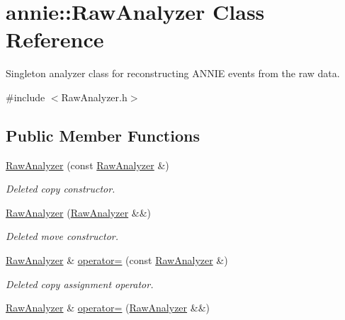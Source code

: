 \hypertarget{classannie_1_1RawAnalyzer}{
\section{annie::RawAnalyzer Class Reference}
\label{classannie_1_1RawAnalyzer}
}


Singleton analyzer class for reconstructing ANNIE events from the raw data.  


{\ttfamily \#include $<$RawAnalyzer.h$>$}\subsection*{Public Member Functions}
\begin{DoxyCompactItemize}
\item 
\hypertarget{classannie_1_1RawAnalyzer_aad70827f2e0cf755a655c0013a99a301}{
\hyperlink{classannie_1_1RawAnalyzer_aad70827f2e0cf755a655c0013a99a301}{RawAnalyzer} (const \hyperlink{classannie_1_1RawAnalyzer}{RawAnalyzer} \&)}
\label{classannie_1_1RawAnalyzer_aad70827f2e0cf755a655c0013a99a301}

\begin{DoxyCompactList}\small\item\em Deleted copy constructor. \item\end{DoxyCompactList}\item 
\hypertarget{classannie_1_1RawAnalyzer_a8105363307f1f568f90b3dadd3f1dbf0}{
\hyperlink{classannie_1_1RawAnalyzer_a8105363307f1f568f90b3dadd3f1dbf0}{RawAnalyzer} (\hyperlink{classannie_1_1RawAnalyzer}{RawAnalyzer} \&\&)}
\label{classannie_1_1RawAnalyzer_a8105363307f1f568f90b3dadd3f1dbf0}

\begin{DoxyCompactList}\small\item\em Deleted move constructor. \item\end{DoxyCompactList}\item 
\hypertarget{classannie_1_1RawAnalyzer_a9ee50418cb10e51da8bdbf29fd2241e0}{
\hyperlink{classannie_1_1RawAnalyzer}{RawAnalyzer} \& \hyperlink{classannie_1_1RawAnalyzer_a9ee50418cb10e51da8bdbf29fd2241e0}{operator=} (const \hyperlink{classannie_1_1RawAnalyzer}{RawAnalyzer} \&)}
\label{classannie_1_1RawAnalyzer_a9ee50418cb10e51da8bdbf29fd2241e0}

\begin{DoxyCompactList}\small\item\em Deleted copy assignment operator. \item\end{DoxyCompactList}\item 
\hypertarget{classannie_1_1RawAnalyzer_a50088150eebb6b5f1043544a7f07924a}{
\hyperlink{classannie_1_1RawAnalyzer}{RawAnalyzer} \& \hyperlink{classannie_1_1RawAnalyzer_a50088150eebb6b5f1043544a7f07924a}{operator=} (\hyperlink{classannie_1_1RawAnalyzer}{RawAnalyzer} \&\&)}
\label{classannie_1_1RawAnalyzer_a50088150eebb6b5f1043544a7f07924a}


\end{DoxyCompactItemize}
